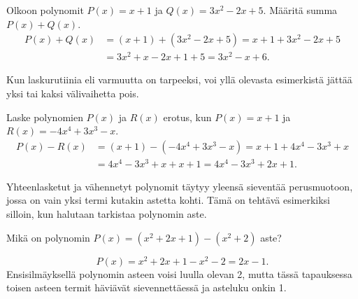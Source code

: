 \begin{esimerkki}
Olkoon polynomit $P(x)=x+1$ ja $Q(x)=3x^2-2x+5$. Määritä summa $P(x)+Q(x)$.
   \begin{align*}
        P(x)+Q(x)&=(x+1)+(3x^2-2x+5) = x+1+3x^2-2x+5 \\
                 &= 3x^2+x-2x+1+5 =3x^2-x+6.
    \end{align*}
\end{esimerkki}

Kun laskurutiinia eli varmuutta on tarpeeksi, voi yllä olevasta esimerkistä jättää yksi tai kaksi välivaihetta pois.


\begin{esimerkki}
    Laske polynomien $P(x)$ ja $R(x)$ erotus, kun $P(x)=x+1$ ja $R(x)=-4x^4+3x^3-x$.
   \begin{align*}
        P(x)-R(x) & =(x+1)-(-4x^4+3x^3-x) =x+1+4x^4-3x^3+x \\
        & =4x^4-3x^3+x+x+1 = 4x^4-3x^3+2x+1.
    \end{align*}
\end{esimerkki}

Yhteenlasketut ja vähennetyt polynomit täytyy yleensä sieventää perusmuotoon, jossa on vain yksi termi kutakin astetta kohti. Tämä on tehtävä esimerkiksi silloin, kun halutaan tarkistaa polynomin aste.

\begin{esimerkki} Mikä on polynomin $P(x)=(x^2+2x+1)-(x^2+2)$ aste?

\[
P(x)=x^2+2x+1-x^2-2=2x-1.
\]
Ensisilmäyksellä polynomin asteen voisi luulla olevan 2, mutta tässä tapauksessa toisen asteen termit häviävät sievennettäessä ja asteluku onkin 1.
\end{esimerkki}
